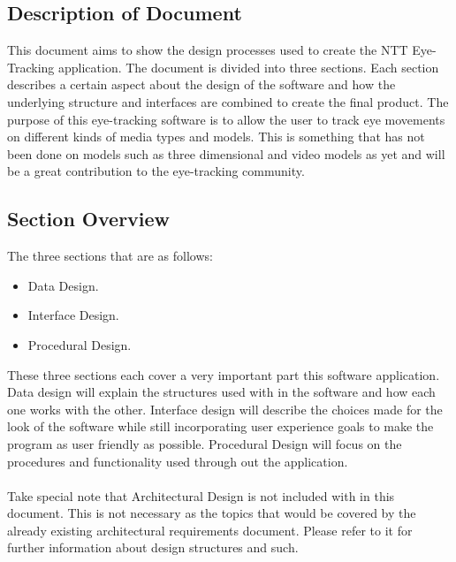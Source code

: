 \subsection{Description of Document}
This document aims to show the design processes used to create the NTT Eye-Tracking application. The document is divided into three sections. Each section describes a certain aspect about the design of the software and how the underlying structure and interfaces are combined to create the final product. The purpose of this eye-tracking software is to allow the user to track eye movements on different kinds of media types and models. This is something that has not been done on models such as three dimensional and video models as yet and will be a great contribution to the eye-tracking community. 

\subsection{Section Overview }
The three sections that are as follows:
\begin{itemize}
\item Data Design.
\item Interface Design.
\item Procedural Design.
\end{itemize}

These three sections each cover a very important part this software application. Data design will explain the structures used with in the software and how each one works with the other. Interface design will describe the choices made for the look of the software while still incorporating user experience goals to make the program as user friendly as possible. Procedural Design will focus on the procedures and functionality used through out the application.\\
\\
Take special note that Architectural Design is not included with in this document. This is not necessary as the topics that would be covered by the already existing architectural requirements document. Please refer to it for further information about design structures and such.